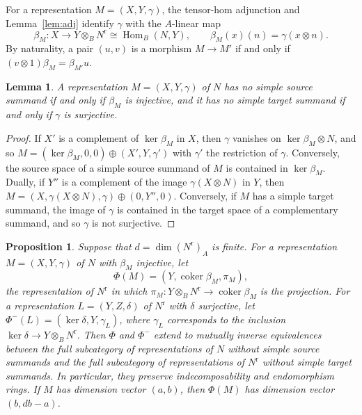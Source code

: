 \documentclass[11pt,a4paper]{amsart}
\newtheorem{proposition}[theorem]{Proposition}
\newtheorem{lemma}[theorem]{Lemma}
\numberwithin{equation}{section}
\newcommand{\Hom}{\operatorname{Hom}}
\newcommand{\coker}{\operatorname{coker}}
\newcommand{\rr}{\mathrm{r}}
\begin{document}
For a representation $M=(X,Y,\gamma)$, the tensor-hom adjunction and Lemma~\ref{lem:adj} identify $\gamma$ with the $A$-linear map
\[
\beta_M\colon X\to Y\otimes_BN^{\rr}\cong\Hom_B(N,Y),\qquad \beta_M(x)(n)=\gamma(x\otimes n).
\]
By naturality, a pair $(u,v)$ is a morphism $M\to M'$ if and only if $(v\otimes1)\beta_M=\beta_{M'}u$.

\begin{lemma}\label{lem:split}
A representation $M=(X,Y,\gamma)$ of $N$ has no simple source summand if and only if $\beta_M$ is injective, and it has no simple target summand if and only if $\gamma$ is surjective.
\end{lemma}

\begin{proof}
If $X'$ is a complement of $\ker\beta_M$ in $X$, then $\gamma$ vanishes on $\ker\beta_M\otimes N$, and so $M=(\ker\beta_M,0,0)\oplus(X',Y,\gamma')$ with $\gamma'$ the restriction of $\gamma$. Conversely, the source space of a simple source summand of $M$ is contained in $\ker\beta_M$. Dually, if $Y''$ is a complement of the image $\gamma(X\otimes N)$ in $Y$, then $M=(X,\gamma(X\otimes N),\gamma)\oplus(0,Y'',0)$. Conversely, if $M$ has a simple target summand, the image of $\gamma$ is contained in the target space of a complementary summand, and so $\gamma$ is not surjective.
\end{proof}

\begin{proposition}\label{prop:reflect}
Suppose that $d=\dim(N^{\rr})_A$ is finite. For a representation $M=(X,Y,\gamma)$ of $N$ with $\beta_M$ injective, let
\[
\Phi(M)=(Y,\coker\beta_M,\pi_M),
\]
the representation of $N^{\rr}$ in which $\pi_M\colon Y\otimes_BN^{\rr}\to\coker\beta_M$ is the projection. For a representation $L=(Y,Z,\delta)$ of $N^{\rr}$ with $\delta$ surjective, let $\Phi^-(L)=(\ker\delta,Y,\gamma_L)$, where $\gamma_L$ corresponds to the inclusion $\ker\delta\to Y\otimes_BN^{\rr}$. Then $\Phi$ and $\Phi^-$ extend to mutually inverse equivalences between the full subcategory of representations of $N$ without simple source summands and the full subcategory of representations of $N^{\rr}$ without simple target summands. In particular, they preserve indecomposability and endomorphism rings. If $M$ has dimension vector $(a,b)$, then $\Phi(M)$ has dimension vector $(b,db-a)$.
\end{proposition}
\end{document}

